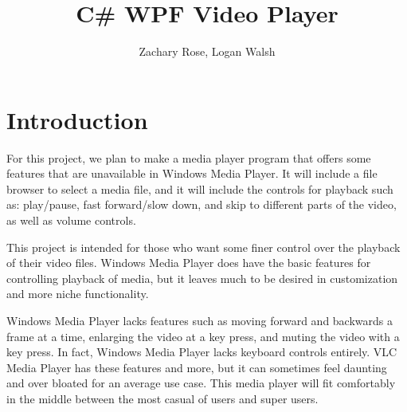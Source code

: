 \documentclass[10pt,conference,onecolumn,compsoc]{IEEEtran}
\begin{document}
\title{C\# WPF Video Player}
%
%


\author{Zachary Rose, Logan Walsh
}



\maketitle


\IEEEdisplaynontitleabstractindextext

\IEEEpeerreviewmaketitle



\section{Introduction}


For this project, we plan to make a media player program that offers some features that are unavailable in Windows Media Player. It will include a file browser to select a media file, and it will include the controls for playback such as: play/pause, fast forward/slow down, and skip to different parts of the video, as well as volume controls. 

This project is intended for those who want some finer control over the playback of their video files. Windows Media Player does have the basic features for controlling playback of media, but it leaves much to be desired in customization and more niche functionality. 

Windows Media Player lacks features such as moving forward and backwards a frame at a time, enlarging the video at a key press, and muting the video with a key press. In fact, Windows Media Player lacks keyboard controls entirely. VLC Media Player has these features and more, but it can sometimes feel daunting and over bloated for an average use case. This media player will fit comfortably in the middle between the most casual of users and super users. 
\end{document}
